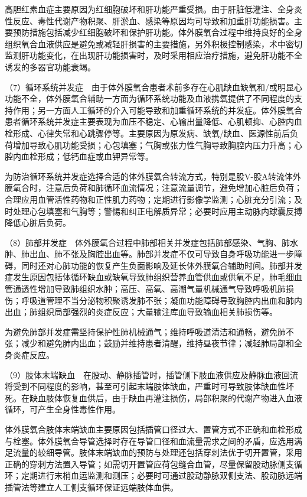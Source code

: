 高胆红素血症主要原因为红细胞破坏和肝功能严重受损。由于肝脏低灌注、全身炎性反应、毒性代谢产物积聚、肝淤血、感染等原因均可导致和加重肝功能损害。主要预防措施包括减少红细胞破坏和保护肝功能。体外膜氧合过程中维持良好的全身组织氧合血液供应是避免或减轻肝损害的主要措施，另外积极控制感染，术中密切监测肝功能变化，在出现肝功能损害时，及时采用相应治疗措施，避免肝功能不全诱发的多器官功能衰竭。

（7）循环系统并发症　由于体外膜氧合患者术前多存在心肌缺血缺氧和/或明显心功能不全，体外膜氧合辅助一方面为循环系统功能及血液携氧提供了不同程度的支持作用；另一方面人工循环的介入可能导致和加重循环系统的并发症。体外膜氧合患者循环系统并发症主要表现为血压不稳定、心输出量降低、心肌顿抑、心腔内血栓形成、心律失常和心跳骤停等。主要原因为原发病、缺氧/缺血、医源性前后负荷增加导致心肌功能受损；心包填塞；气胸或张力性气胸导致胸腔内压力升高；心腔内血栓形成；低钙血症或血钾异常等。

为防治循环系统并发症选择合适的体外膜氧合转流方式，特别是股V-股A转流体外膜氧合时，注意后负荷和肺循环血流情况；注意流量调节，避免增加心脏后负荷；合理应用血管活性药物和正性肌力药物；定期进行影像学监测；心脏充分引流；及时处理心包填塞和气胸等；警惕和纠正电解质异常；必要时应用主动脉内球囊反搏降低心脏后负荷。

（8）肺部并发症　体外膜氧合过程中肺部相关并发症包括肺部感染、气胸、肺水肿、肺出血、肺不张及胸腔出血等。肺部并发症不仅可导致自身呼吸功能进一步障碍，同时还对心肺功能的恢复产生负面影响及延长体外膜氧合辅助时间。肺部并发症发生原因包括体循环缺血或缺氧导致肺组织营养血管供血或供氧不足，肺毛细血管通透性增加导致肺组织水肿；高压、高氧、高潮气量机械通气导致呼吸机肺损伤；呼吸道管理不当分泌物积聚诱发肺不张；凝血功能障碍导致胸腔内出血和肺内出血；肺组织局部强烈的炎症反应；大量输注库血导致输血相关肺损伤等。

为避免肺部并发症需坚持保护性肺机械通气；维持呼吸道清洁和通畅，避免肺不张；减少和避免肺内出血；鼓励并维持患者清醒，维持昼夜节律；减轻肺局部和全身炎症反应。

（9）肢体末端缺血　在股动、静脉插管时，插管侧下肢血液供应及静脉血液回流将受到不同程度的影响，甚至可引起末端肢体缺血，严重时可导致肢体缺血性坏死。在缺血肢体恢复血供后，由于缺血再灌注损伤，局部积聚的代谢产物进入血液循环，可产生全身性毒性作用。

体外膜氧合肢体末端缺血主要原因包括插管口径过大、置管方式不正确和血栓形成与栓塞。体外膜氧合导管选择时存在导管口径和血流量需求之间的矛盾，应选用满足流量的较细导管。肢体末端缺血的预防与处理还包括穿刺法优于切开置管，采用正确的穿刺方法置入导管；如需切开置管应荷包缝合血管，尽量保留股动脉侧支循环；定期进行末梢血运监测和测压；必要时可通过股动静脉双侧支法、股动脉远端插管法等建立人工侧支循环保证远端肢体血供。

